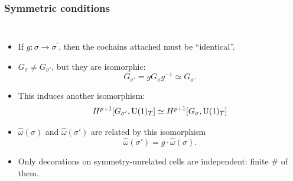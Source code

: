 \documentclass[xcolor=table, aspectratio=169,ignorenonframetext]{beamer}
\newcommand{\uone}{\text U(1)}
\begin{document}
\begin{frame}
	\frametitle{Symmetric conditions}
	\begin{columns}
		\begin{itemize}
			\item If $g:\sigma\rightarrow\sigma^\prime$, then the cochains attached must be ``identical''.
			\item $G_\sigma\neq G_{\sigma'}$, but they are isomorphic:
			\[G_{\sigma'}=gG_\sigma g^{-1}\simeq G_\sigma.\]
			\item This induces another isomorphism:
			\[H^{p+1}[G_{\sigma'},\uone_T]\simeq H^{p+1}[G_\sigma,\uone_T]\]
			\item $\hat\omega(\sigma)$ and $\hat\omega(\sigma')$ are related by this isomorphism
			\[\hat\omega(\sigma') = g\cdot \hat\omega(\sigma).\]
			\item Only decorations on symmetry-unrelated cells are independent: finite \# of them.
		\end{itemize}
	\end{columns}
\end{frame}
\end{document}
